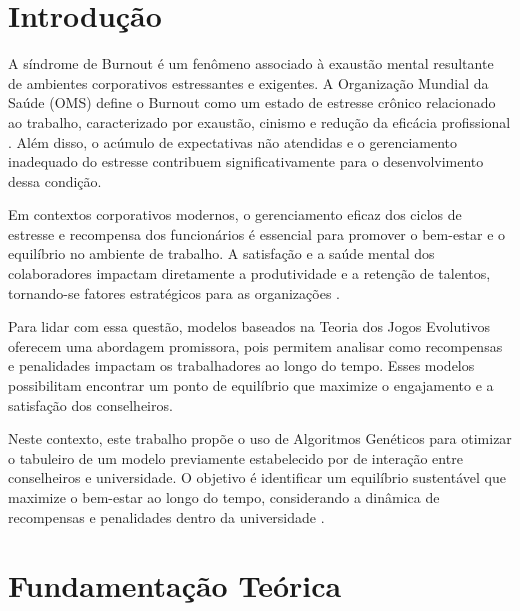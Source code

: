 \documentclass[
	article,			%
	11pt,				%
	oneside,			%
	a4paper,			%
	english,			%
	brazil,				%
	sumario=tradicional
	]{abntex2}
\begin{document}
\frenchspacing 

\maketitle

\section*{Introdução}

A síndrome de Burnout é um fenômeno associado à exaustão mental resultante de ambientes corporativos estressantes e exigentes. A Organização Mundial da Saúde (OMS) define o Burnout como um estado de estresse crônico relacionado ao trabalho, caracterizado por exaustão, cinismo e redução da eficácia profissional \cite{Downey2023}. Além disso, o acúmulo de expectativas não atendidas e o gerenciamento inadequado do estresse contribuem significativamente para o desenvolvimento dessa condição.

Em contextos corporativos modernos, o gerenciamento eficaz dos ciclos de estresse e recompensa dos funcionários é essencial para promover o bem-estar e o equilíbrio no ambiente de trabalho. A satisfação e a saúde mental dos colaboradores impactam diretamente a produtividade e a retenção de talentos, tornando-se fatores estratégicos para as organizações  \cite{Slusarz2022}.

Para lidar com essa questão, modelos baseados na Teoria dos Jogos Evolutivos oferecem uma abordagem promissora, pois permitem analisar como recompensas e penalidades impactam os trabalhadores ao longo do tempo. Esses modelos possibilitam encontrar um ponto de equilíbrio que maximize o engajamento e a satisfação dos conselheiros\cite{Sanfey2003}.

Neste contexto, este trabalho propõe o uso de Algoritmos Genéticos para otimizar o tabuleiro de um modelo previamente estabelecido por \cite{Zhang2020Burnout} de interação entre conselheiros e universidade. O objetivo é identificar um equilíbrio sustentável que maximize o bem-estar ao longo do tempo, considerando a dinâmica de recompensas e penalidades dentro da universidade \cite{Zhang2020Burnout}.

\section{Fundamentação Teórica}
\end{document}
